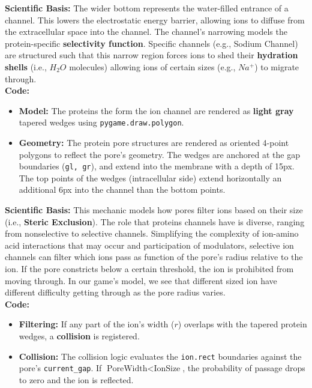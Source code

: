 \documentclass[11pt]{article}
\begin{document}
\begin{tcolorbox}[colback=gray!10, colframe=gray!50!black,title=Game Mechanic: Tapered Protein Wedges]

	\textbf{Scientific Basis:} The wider bottom represents the water-filled entrance of a channel. This lowers the electrostatic energy barrier, allowing ions to diffuse from the extracellular space into the channel. The channel's narrowing models the protein-specific \textbf{selectivity function}. Specific channels (e.g., Sodium Channel) are structured such that this narrow region forces ions to shed their \textbf{hydration shells} (i.e., $H_2O$ molecules) allowing ions of certain sizes (e.g., $Na^+$) to migrate through.\\

	\textbf{Code:}
	\begin{itemize}
		\item \textbf{Model:} The proteins the form the ion channel are rendered as {\color{gray}\textbf{light gray}} tapered wedges using \texttt{pygame.draw.polygon}. 
		\item \textbf{Geometry:} The protein pore structures are rendered as oriented 4-point polygons to reflect the pore's geometry. The wedges are anchored at the gap boundaries (\texttt{gl, gr}), and extend into the membrane with a depth of 15px. The top points of the wedges (intracellular side) extend horizontally an additional 6px into the channel than the bottom points.
	\end{itemize}

\end{tcolorbox}

\begin{tcolorbox}[colback=gray!10, colframe=gray!50!black,title=Game Mechanic: Size-Dependent Filtering]

	\textbf{Scientific Basis:} This mechanic models how pores filter ions based on their size (i.e., \textbf{Steric Exclusion}). The role that proteins channels have is diverse, ranging from nonselective to selective channels. Simplifying the complexity of ion-amino acid interactions that may occur and participation of modulators, selective ion channels can filter which ions pass as function of the pore's radius relative to the ion. If the pore constricts below a certain threshold, the ion is prohibited from moving through. In our game's model, we see that different sized ion have different difficulty getting through as the pore radius varies.\\

	\textbf{Code:}
	\begin{itemize}
	    \item \textbf{Filtering:} If any part of the ion's width ($r$) overlaps with the tapered protein wedges, a \textbf{collision} is registered.
		\item \textbf{Collision:} The collision logic evaluates the \texttt{ion.rect} boundaries against the pore's \texttt{current\_gap}.   If $\text{PoreWidth} < \text{IonSize}$, the probability of passage drops to zero and the ion is reflected.
	\end{itemize}

\end{tcolorbox}
\end{document}
